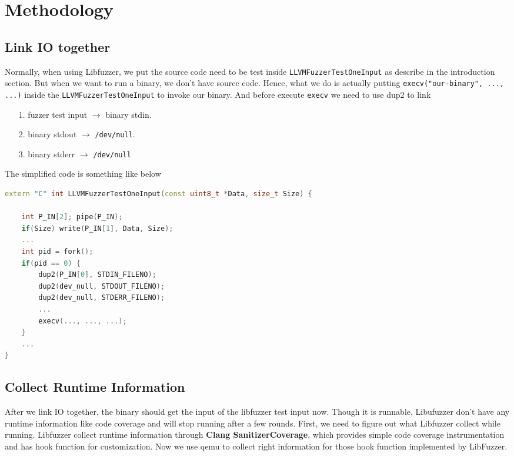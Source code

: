 
\section{Methodology}
\label{sec:method}

\subsection{Link IO together}

Normally, when using Libfuzzer, we put the source code need to be test inside \texttt{LLVMFuzzerTestOneInput} as describe in the introduction section.
But when we want to run a binary, we don't have source code.
Hence, what we do is actually putting \texttt{execv("our-binary", ..., ...)} inside the \texttt{LLVMFuzzerTestOneInput} to invoke our binary.
And before execute \texttt{execv} we need to use dup2 to link

\begin{enumerate}
  \item [1.] fuzzer test input $\to$ binary stdin.
  \item [2.] binary stdout $\to$ \texttt{/dev/null}.
  \item [3.] binary stderr $\to$ \texttt{/dev/null}
\end{enumerate}

The simplified code is something like below

\begin{lstlisting}[language = c++]
extern "C" int LLVMFuzzerTestOneInput(const uint8_t *Data, size_t Size) {

    int P_IN[2]; pipe(P_IN);
    if(Size) write(P_IN[1], Data, Size);
    ...
    int pid = fork();
    if(pid == 0) {
        dup2(P_IN[0], STDIN_FILENO);
        dup2(dev_null, STDOUT_FILENO);
        dup2(dev_null, STDERR_FILENO);
        ...
        execv(..., ..., ...);
    }
    ...
}
\end{lstlisting}

\subsection{Collect Runtime Information}

After we link IO together, the binary should get the input of the libfuzzer test input now.
Though it is runnable, Libufuzzer don't have any runtime information like code coverage and will stop running after a few rounds.
First, we need to figure out what Libfuzzer collect while running.
Libfuzzer collect runtime information through \textbf{Clang SanitizerCoverage}, which provides simple code coverage instrumentation and has hook function for customization.
Now we use qemu to collect right information for those hook function implemented by LibFuzzer.

